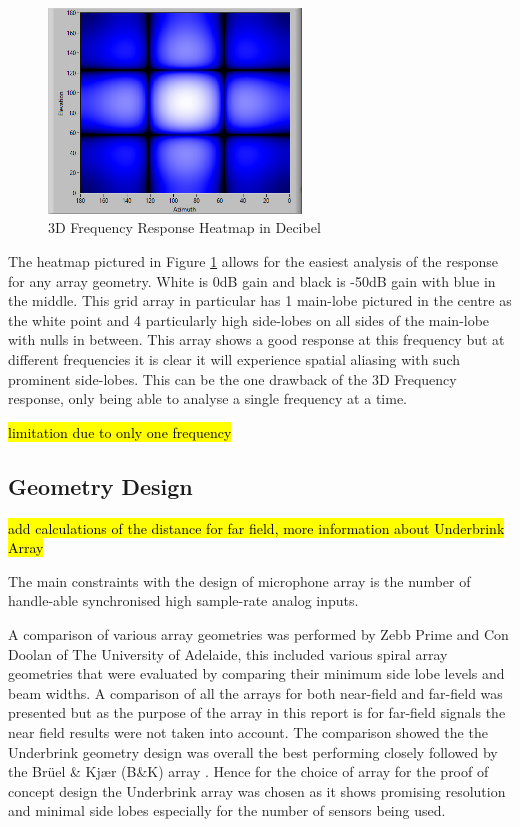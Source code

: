 \documentclass{UoNMCHA}
\numberwithin{equation}{section}
\begin{document}
    \begin{figure}[H]
        \centering
        \includegraphics[keepaspectratio, width = 0.6\textwidth]{Figures/3DHeatFigure.png}
        \caption{3D Frequency Response Heatmap in Decibel}
        \label{fig:3D Heatmap}
    \end{figure}
    
    The heatmap pictured in Figure \ref{fig:3D Heatmap} allows for the easiest analysis of the response for any array geometry. White is 0dB gain and black is -50dB gain with blue in the middle. This grid array in particular has 1 main-lobe pictured in the centre as the white point and 4 particularly high side-lobes on all sides of the main-lobe with nulls in between. This array shows a good response at this frequency but at different frequencies it is clear it will experience spatial aliasing with such prominent side-lobes. This can be the one drawback of the 3D Frequency response, only being able to analyse a single frequency at a time.
    
    \hl{limitation due to only one frequency}
\subsection{Geometry Design} \label{sec:Array Geometry}
    \hl{add calculations of the distance for far field, more information about Underbrink Array}

    The main constraints with the design of microphone array is the number of handle-able synchronised high sample-rate analog inputs.
    
    A comparison of various array geometries was performed by Zebb Prime and Con Doolan of The University of Adelaide, this included various spiral array geometries that were evaluated by comparing their minimum side lobe levels and beam widths. A comparison of all the arrays for both near-field and far-field was presented but as the purpose of the array in this report is for far-field signals the near field results were not taken into account. The comparison showed the the Underbrink geometry design was overall the best performing closely followed by the Brüel \& Kjær (B\&K) array \citep{Pri13}. Hence for the choice of array for the proof of concept design the Underbrink array was chosen as it shows promising resolution and minimal side lobes especially for the number of sensors being used.
    
\end{document}
